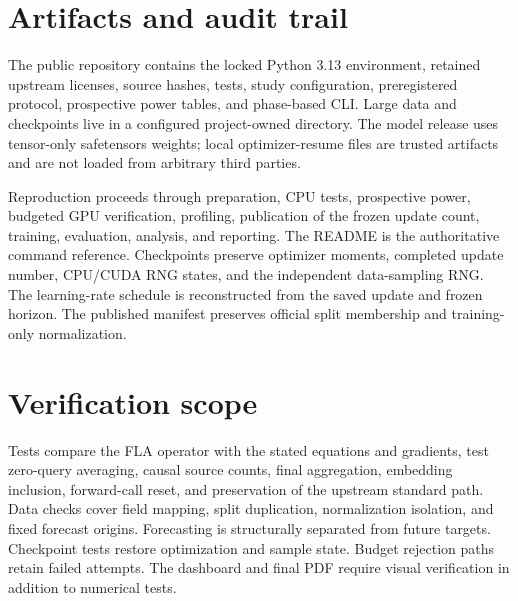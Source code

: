 \section{Artifacts and audit trail}
The public repository\cite{studycode} contains the locked Python 3.13 environment, retained upstream licenses, source hashes, tests, study configuration, preregistered protocol, prospective power tables, and phase-based CLI. Large data and checkpoints live in a configured project-owned directory. The model release uses tensor-only safetensors weights; local optimizer-resume files are trusted artifacts and are not loaded from arbitrary third parties.

Reproduction proceeds through preparation, CPU tests, prospective power, budgeted GPU verification, profiling, publication of the frozen update count, training, evaluation, analysis, and reporting. The README is the authoritative command reference. Checkpoints preserve optimizer moments, completed update number, CPU/CUDA RNG states, and the independent data-sampling RNG. The learning-rate schedule is reconstructed from the saved update and frozen horizon. The published manifest preserves official split membership and training-only normalization.

\section{Verification scope}
Tests compare the FLA operator with the stated equations and gradients, test zero-query averaging, causal source counts, final aggregation, embedding inclusion, forward-call reset, and preservation of the upstream standard path. Data checks cover field mapping, split duplication, normalization isolation, and fixed forecast origins. Forecasting is structurally separated from future targets. Checkpoint tests restore optimization and sample state. Budget rejection paths retain failed attempts. The dashboard and final PDF require visual verification in addition to numerical tests.

